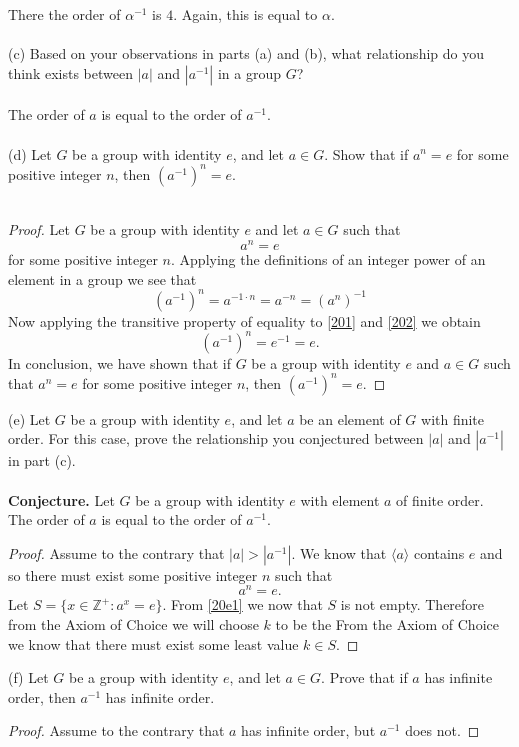 \documentclass[11pt,a4paper]{article}
\begin{document}
There the order of $\alpha^{-1}$ is $4$. Again, this is equal to $\alpha$.\\
~\\
(c) Based on your observations in parts (a) and (b), what relationship do you
think exists between $|a|$ and $|a^{-1}|$ in a group $G$?\\
~\\
The order of $a$ is equal to the order of $a^{-1}$.\\
~\\
(d) Let $G$ be a group with identity $e$, and let $a \in G$. Show that if $a^n = e$ for
some positive integer $n$, then $(a^{-1})^n = e$.\\
~\\
\begin{proof}
Let $G$ be a group with identity $e$ and let $a \in G$ such that 
\begin{equation}\label{201}
a^n = e
\end{equation}
for some positive integer $n$. Applying the definitions of an integer power of an element in a group we see that 
\begin{equation}\label{202}
(a^{-1})^n = a^{-1\cdot n} = a^{-n} = (a^n)^{-1}
\end{equation}
Now applying the transitive property of equality to \eqref{201} and \eqref{202} we obtain
\[
(a^{-1})^n = e^{-1} = e.
\]
In conclusion, we have shown that if $G$ be a group with identity $e$ and $a \in G$ such that $a^n = e$ for some positive integer $n$, then $(a^{-1})^n = e$.
\end{proof}
(e) Let $G$ be a group with identity $e$, and let $a$ be an element of $G$ with finite
order. For this case, prove the relationship you conjectured between $|a|$
and $|a^{-1}|$ in part (c).\\
~\\
{\bf Conjecture.}  Let $G$ be a group with identity $e$ with element $a$ of finite order. The order of $a$ is equal to the order of $a^{-1}$.
\begin{proof}
Assume to the contrary that $|a|>|a^{-1}|$. We know that $\langle a \rangle$ contains $e$ and so there must exist some positive integer $n$ such that
\begin{equation}\label{20e1}
a^n = e.
\end{equation}
Let $S=\{x\in\mathbb{Z}^+:a^x=e\}$. From \eqref{20e1} we now that $S$ is not empty. Therefore from the Axiom of Choice we will choose $k$ to be the 
From the Axiom of Choice we know that there must exist some least value $k\in S$. 
\end{proof}

(f) Let $G$ be a group with identity $e$, and let $a \in G$. Prove that if $a$ has infinite
order, then $a^{-1}$ has infinite order.

\begin{proof}
Assume to the contrary that $a$ has infinite order, but $a^{-1}$ does not.
\end{proof}
\end{document}
